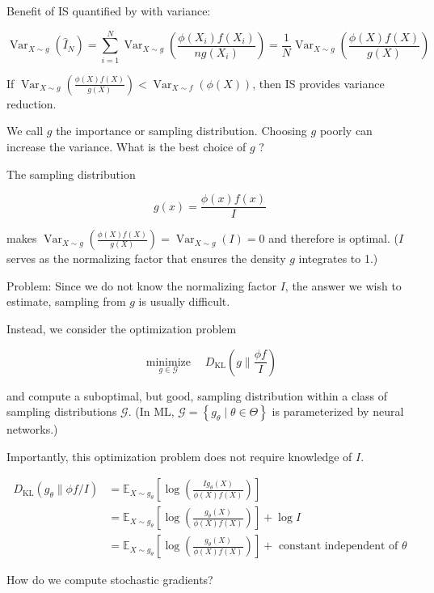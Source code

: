 \documentclass{report}
\begin{document}
\begin{concept}
    Benefit of IS quantified by with variance:

    $$
    \operatorname{Var}_{X \sim g}\left(\hat{I}_{N}\right)=\sum_{i=1}^{N} \operatorname{Var}_{X \sim g}\left(\frac{\phi\left(X_{i}\right) f\left(X_{i}\right)}{n g\left(X_{i}\right)}\right)=\frac{1}{N} \operatorname{Var}_{X \sim g}\left(\frac{\phi(X) f(X)}{g(X)}\right)
    $$

    If $\operatorname{Var}_{X \sim g}\left(\frac{\phi(X) f(X)}{g(X)}\right)<\operatorname{Var}_{X \sim f}(\phi(X))$, then IS provides variance reduction.

    We call $g$ the importance or sampling distribution. Choosing $g$ poorly can increase the variance. What is the best choice of $g$ ?

    \par\noindent\textcolor{gray}{\hdashrule{\textwidth}{0.4pt}{1pt 2pt}}

    The sampling distribution

    $$
    g(x)=\frac{\phi(x) f(x)}{I}
    $$

    makes $\operatorname{Var}_{X \sim g}\left(\frac{\phi(X) f(X)}{g(X)}\right)=\operatorname{Var}_{X \sim g}(I)=0$ and therefore is optimal. ($I$ serves as the normalizing factor that ensures the density $g$ integrates to 1.)

    Problem: Since we do not know the normalizing factor $I$, the answer we wish to estimate, sampling from $g$ is usually difficult.
\end{concept}

\begin{concept}
    Instead, we consider the optimization problem

    $$
    \underset{g \in \mathcal{G}}{\operatorname{minimize}} \quad D_{\mathrm{KL}}\left(g \| \frac{\phi f}{I}\right)
    $$

    and compute a suboptimal, but good, sampling distribution within a class of sampling distributions $\mathcal{G}$. (In ML, $\mathcal{G}=\left\{g_{\theta} \mid \theta \in \Theta\right\}$ is parameterized by neural networks.)

    Importantly, this optimization problem does not require knowledge of $I$.

    $$
    \begin{aligned}
    D_{\mathrm{KL}}\left(g_{\theta} \| \phi f / I\right) & =\mathbb{E}_{X \sim g_{\theta}}\left[\log \left(\frac{I g_{\theta}(X)}{\phi(X) f(X)}\right)\right] \\
    & =\mathbb{E}_{X \sim g_{\theta}}\left[\log \left(\frac{g_{\theta}(X)}{\phi(X) f(X)}\right)\right]+\log I \\
    & =\mathbb{E}_{X \sim g_{\theta}}\left[\log \left(\frac{g_{\theta}(X)}{\phi(X) f(X)}\right)\right]+\text { constant independent of } \theta
    \end{aligned}
    $$

    How do we compute stochastic gradients?
\end{concept}
\end{document}
